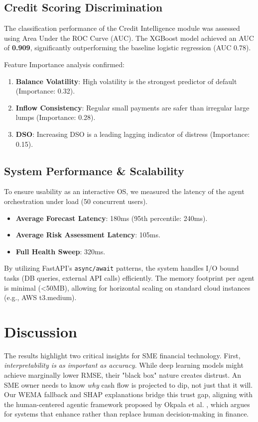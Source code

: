 \documentclass[conference]{IEEEtran}
\begin{document}
\subsection{Credit Scoring Discrimination}
The classification performance of the Credit Intelligence module was assessed using Area Under the ROC Curve (AUC).
The XGBoost model achieved an AUC of \textbf{0.909}, significantly outperforming the baseline logistic regression (AUC 0.78).

Feature Importance analysis confirmed:
\begin{enumerate}
    \item \textbf{Balance Volatility}: High volatility is the strongest predictor of default (Importance: 0.32).
    \item \textbf{Inflow Consistency}: Regular small payments are safer than irregular large lumps (Importance: 0.28).
    \item \textbf{DSO}: Increasing DSO is a leading lagging indicator of distress (Importance: 0.15).
\end{enumerate}

\subsection{System Performance \& Scalability}
To ensure usability as an interactive OS, we measured the latency of the agent orchestration under load (50 concurrent users).
\begin{itemize}
    \item \textbf{Average Forecast Latency}: 180ms (95th percentile: 240ms).
    \item \textbf{Average Risk Assessment Latency}: 105ms.
    \item \textbf{Full Health Sweep}: 320ms.
\end{itemize}
By utilizing FastAPI's \texttt{async/await} patterns, the system handles I/O bound tasks (DB queries, external API calls) efficiently. The memory footprint per agent is minimal (<50MB), allowing for horizontal scaling on standard cloud instances (e.g., AWS t3.medium).

\section{Discussion}

The results highlight two critical insights for SME financial technology. First, \textit{interpretability is as important as accuracy}. While deep learning models might achieve marginally lower RMSE, their "black box" nature creates distrust. An SME owner needs to know \textit{why} cash flow is projected to dip, not just that it will. Our WEMA fallback and SHAP explanations bridge this trust gap, aligning with the human-centered agentic framework proposed by Okpala et al. \cite{okpala2025}, which argues for systems that enhance rather than replace human decision-making in finance.
\end{document}
